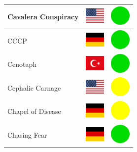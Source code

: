 \documentclass[12pt, a4paper, twoside]{report}
\begin{document}
\begin{center}
\begin{longtable}{|p{5cm}|p{2cm}|p{2cm}|}
 Cavalera Conspiracy                                        & \includegraphics[width=1cm]{../4x3/us} &   \includegraphics[width=1cm]{../likes/y} \\ \hline
 CCCP                                                       & \includegraphics[width=1cm]{../4x3/de} &   \includegraphics[width=1cm]{../likes/y} \\ \hline
 Cenotaph                                                   & \includegraphics[width=1cm]{../4x3/tr} &   \includegraphics[width=1cm]{../likes/y} \\ \hline
 Cephalic Carnage                                           & \includegraphics[width=1cm]{../4x3/us} &   \includegraphics[width=1cm]{../likes/m} \\ \hline
 Chapel of Disease                                          & \includegraphics[width=1cm]{../4x3/de} &   \includegraphics[width=1cm]{../likes/m} \\ \hline
 Chasing Fear                                               & \includegraphics[width=1cm]{../4x3/de} &   \includegraphics[width=1cm]{../likes/y} \\ \hline

\end{longtable}
\end{center}
\end{document}
